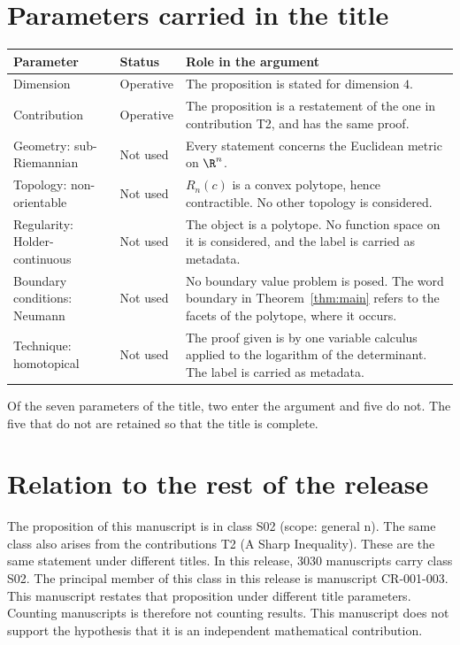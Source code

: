 \documentclass[11pt]{article}
\begin{document}
\section{Parameters carried in the title}\label{sec:params}
\begin{center}
\small
\begin{tabular}{p{}p{}p{}}
\toprule
Parameter & Status & Role in the argument \\
\midrule
Dimension & Operative & The proposition is stated for dimension $4$. \\
Contribution & Operative & The proposition is a restatement of the one in contribution T2, and has the same proof. \\
Geometry: sub-Riemannian & Not used & Every statement concerns the Euclidean metric on $\R^n$. \\
Topology: non-orientable & Not used & $R_n(c)$ is a convex polytope, hence contractible. No other topology is considered. \\
Regularity: Holder-continuous & Not used & The object is a polytope. No function space on it is considered, and the label is carried as metadata. \\
Boundary conditions: Neumann & Not used & No boundary value problem is posed. The word boundary in Theorem~\ref{thm:main} refers to the facets of the polytope, where it occurs. \\
Technique: homotopical & Not used & The proof given is by one variable calculus applied to the logarithm of the determinant. The label is carried as metadata. \\
\bottomrule
\end{tabular}
\end{center}
Of the seven parameters of the title, two enter the argument and five do not. The five that do not are retained so that the title is complete.

\section{Relation to the rest of the release}
The proposition of this manuscript is in class S02 (scope: general n). The same class also arises from the contributions T2 (A Sharp Inequality). These are the same statement under different titles.
In this release, 3030 manuscripts carry class S02. The principal member of this class in this release is manuscript CR-001-003. This manuscript restates that proposition under different title parameters.
Counting manuscripts is therefore not counting results. This manuscript does not support the hypothesis that it is an independent mathematical contribution.
\end{document}
